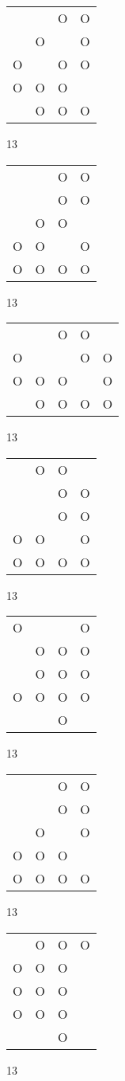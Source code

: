\begin{tabular}{|m{0.2cm}m{0.2cm}m{0.2cm}m{0.2cm}|}\hline
 & &O&O\\
 &O& &O\\
O& &O&O\\
O&O&O& \\
 &O&O&O\\
\hline\end{tabular}13
\begin{tabular}{|m{0.2cm}m{0.2cm}m{0.2cm}m{0.2cm}|}\hline
 & &O&O\\
 & &O&O\\
 &O&O& \\
O&O& &O\\
O&O&O&O\\
\hline\end{tabular}13
\begin{tabular}{|m{0.2cm}m{0.2cm}m{0.2cm}m{0.2cm}m{0.2cm}|}\hline
 & &O&O& \\
O& & &O&O\\
O&O&O& &O\\
 &O&O&O&O\\
\hline\end{tabular}13
\begin{tabular}{|m{0.2cm}m{0.2cm}m{0.2cm}m{0.2cm}|}\hline
 &O&O& \\
 & &O&O\\
 & &O&O\\
O&O& &O\\
O&O&O&O\\
\hline\end{tabular}13
\begin{tabular}{|m{0.2cm}m{0.2cm}m{0.2cm}m{0.2cm}|}\hline
O& & &O\\
 &O&O&O\\
 &O&O&O\\
O&O&O&O\\
 & &O& \\
\hline\end{tabular}13
\begin{tabular}{|m{0.2cm}m{0.2cm}m{0.2cm}m{0.2cm}|}\hline
 & &O&O\\
 & &O&O\\
 &O& &O\\
O&O&O& \\
O&O&O&O\\
\hline\end{tabular}13
\begin{tabular}{|m{0.2cm}m{0.2cm}m{0.2cm}m{0.2cm}|}\hline
 &O&O&O\\
O&O&O& \\
O&O&O& \\
O&O&O& \\
 & &O& \\
\hline\end{tabular}13
